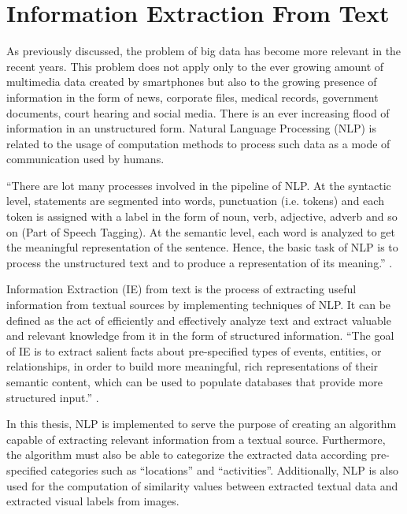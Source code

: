 \cleardoublepage


\chapter{Information Extraction From Text}
\label{ch:nlp}

As previously discussed, the problem of big data has become more relevant in the recent years.  This problem does not apply only to the ever growing amount of multimedia data created by smartphones but also to the growing presence of information in the form of news, corporate files, medical records, government documents, court hearing and social media. There is an ever increasing flood of information in an unstructured form. Natural Language Processing (NLP) is related to the usage of computation methods to process such data as a mode of communication used by humans.

``There are lot many processes involved in the pipeline of NLP. At the syntactic level, statements are segmented into words, punctuation (i.e.  tokens) and each token is assigned with a label in the form of noun, verb, adjective, adverb and so on (Part of Speech Tagging).  At the semantic level, each word is analyzed to get the meaningful representation of the sentence.  Hence, the basic task of NLP is to process the unstructured text and to produce a representation of its meaning.''  \cite{singh2018natural}.



Information Extraction (IE) from text is the process of extracting useful information from textual sources by implementing techniques of NLP. It can be defined as the act of efficiently and effectively analyze text and extract valuable and relevant knowledge from it in the form of structured information. ``The goal of IE is to extract salient facts about pre-specified types of events, entities, or relationships, in order to build more meaningful, rich representations of their semantic content, which can be used to populate databases that provide more structured input.'' \cite{singh2018natural}.

In this thesis, NLP is implemented to serve the purpose of creating an algorithm capable of extracting relevant information from a textual source. Furthermore, the algorithm must also be able to categorize the extracted data according pre-specified categories such as \enquote{locations} and \enquote{activities}. Additionally, NLP is also used for the computation of similarity values between extracted textual data and extracted visual labels from images.

